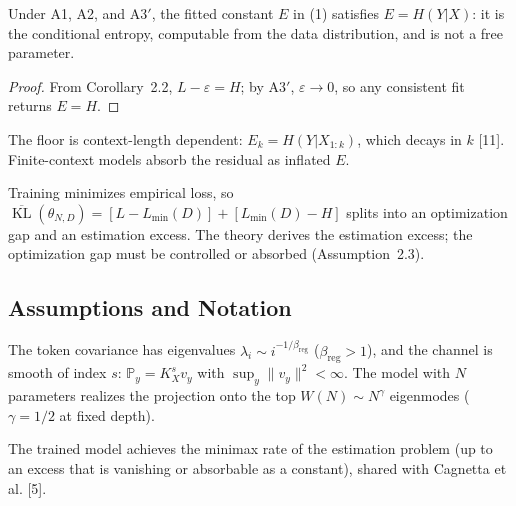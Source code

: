 \documentclass[entropy,article,submit,moreauthors,pdftex]{mdpi}
\newcommand{\eps}{\varepsilon}
\newcommand{\KL}{\operatorname{KL}}
\newcommand{\Prob}{\mathbb{P}}
\begin{document}
\begin{theorem}
\label{thm:identified}
Under A1, A2, and A3$'$, the fitted constant $E$ in (1) satisfies
$E=H(Y|X)$: it is the conditional entropy, computable from the data
distribution, and is not a free parameter.
\end{theorem}

\begin{proof}
From Corollary~2.2, $L-\eps=H$; by A3$'$, $\eps\to0$, so any
consistent fit returns $E=H$.
\end{proof}

\begin{remark}
\label{rem:perlength}
The floor is context-length dependent: $E_k=H(Y|X_{1:k})$, which decays in $k$
[11].  Finite-context models absorb the residual as inflated
$E$.
\end{remark}

\begin{remark}
\label{rem:slack}
Training minimizes empirical loss, so
$\overline{\KL}(\theta_{N,D})=[L-L_{\min}(D)]+[L_{\min}(D)-H]$ splits into an
optimization gap and an estimation excess.  The theory derives the estimation
excess; the optimization gap must be controlled or absorbed
(Assumption~2.3).
\end{remark}

\subsection{Assumptions and Notation}
\label{sec:assumptions}

\begin{assumption}
\label{ass:spectral}
The token covariance has eigenvalues $\lambda_i\sim i^{-1/\beta_{\mathrm{reg}}}$
($\beta_{\mathrm{reg}}>1$), and the channel is smooth of index $s$:
$\Prob_{y}=K_X^s v_y$ with $\sup_y\|v_y\|^2<\infty$.  The model with $N$
parameters realizes the projection onto the top $W(N)\!\sim\!N^{\gamma}$
eigenmodes ($\gamma\!=\!1/2$ at fixed depth).
\end{assumption}

\begin{assumption}
\label{ass:fastlearn}
The trained model achieves the minimax rate of the estimation problem
(up to an excess that is vanishing or absorbable as a constant), shared with
Cagnetta et al. [5].
\end{assumption}
\end{document}
